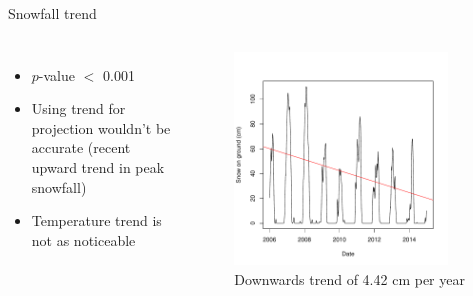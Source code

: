 \documentclass{beamer}
\begin{document}
\begin{frame}{Snowfall trend}

\begin{columns}


{\small
\begin{itemize}
\item $p$-value $<$ 0.001
\item Using trend for projection wouldn't be accurate (recent upward trend in peak snowfall)
\item Temperature trend is not as noticeable
\end{itemize}
}

\vspace{30mm}


\vspace{-18mm}
\begin{figure}
\includegraphics[width=0.9\textwidth]{report-snowtrend}
\vspace{-2mm}
\caption{{\footnotesize Downwards trend of 4.42 cm per year}}
\vspace{10mm}
\end{figure}

\end{columns}

\end{frame}
\end{document}
